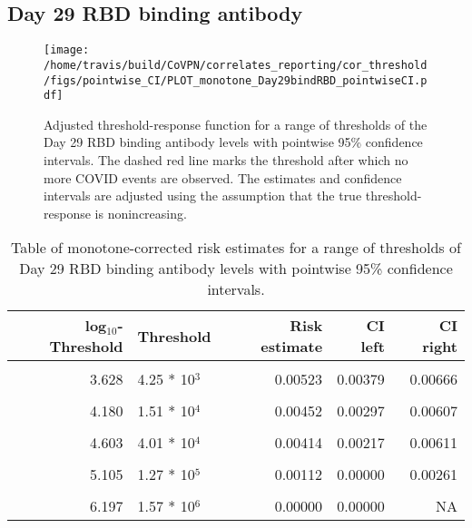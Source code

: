 \documentclass[]{book}
\theoremstyle{definition}
\theoremstyle{definition}
\theoremstyle{definition}
\newcommand{\1}{\mathbbm{1}}
\begin{document}
\newpage

\newpage

\newpage

\hypertarget{day-29-rbd-binding-antibody-1}{%
\subsection{Day 29 RBD binding antibody}\label{day-29-rbd-binding-antibody-1}}

\begin{figure}[H]
\centering
\texttt{[image: /home/travis/build/CoVPN/correlates\_reporting/cor\_threshold/figs/pointwise\_CI/PLOT\_monotone\_Day29bindRBD\_pointwiseCI.pdf]}
\caption{Adjusted threshold-response function for a range of thresholds of the
  Day 29 RBD binding antibody levels with pointwise 95\% confidence intervals. The dashed red line marks the threshold after which no more COVID events are observed. The estimates and confidence intervals are adjusted using the assumption that the true threshold-response is nonincreasing.}
\end{figure}
\begin{table}[!h]

\caption{\label{tab:unnamed-chunk-373}Table of monotone-corrected risk estimates for a range of thresholds of Day 29 RBD binding antibody levels with pointwise 95\% confidence intervals.}
\centering
\begin{tabular}[t]{rlrrr}
\toprule
log$_{10}$-Threshold & Threshold & Risk estimate & CI left & CI right\\
\midrule
\cellcolor{gray!6}{2.882} & \cellcolor{gray!6}{7.62 * 10$^2$} & \cellcolor{gray!6}{0.00576} & \cellcolor{gray!6}{0.00435} & \cellcolor{gray!6}{0.00718}\\
3.628 & 4.25 * 10$^3$ & 0.00523 & 0.00379 & 0.00666\\
\cellcolor{gray!6}{3.889} & \cellcolor{gray!6}{7.74 * 10$^3$} & \cellcolor{gray!6}{0.00459} & \cellcolor{gray!6}{0.00316} & \cellcolor{gray!6}{0.00602}\\
4.180 & 1.51 * 10$^4$ & 0.00452 & 0.00297 & 0.00607\\
\cellcolor{gray!6}{4.395} & \cellcolor{gray!6}{2.48 * 10$^4$} & \cellcolor{gray!6}{0.00452} & \cellcolor{gray!6}{0.00264} & \cellcolor{gray!6}{0.00640}\\
4.603 & 4.01 * 10$^4$ & 0.00414 & 0.00217 & 0.00611\\
\cellcolor{gray!6}{4.826} & \cellcolor{gray!6}{6.70 * 10$^4$} & \cellcolor{gray!6}{0.00365} & \cellcolor{gray!6}{0.00148} & \cellcolor{gray!6}{0.00583}\\
5.105 & 1.27 * 10$^5$ & 0.00112 & 0.00000 & 0.00261\\
\cellcolor{gray!6}{5.422} & \cellcolor{gray!6}{2.64 * 10$^5$} & \cellcolor{gray!6}{0.00112} & \cellcolor{gray!6}{0.00000} & \cellcolor{gray!6}{0.00314}\\
6.197 & 1.57 * 10$^6$ & 0.00000 & 0.00000 & NA\\
\bottomrule
\end{tabular}
\end{table}
\end{document}
